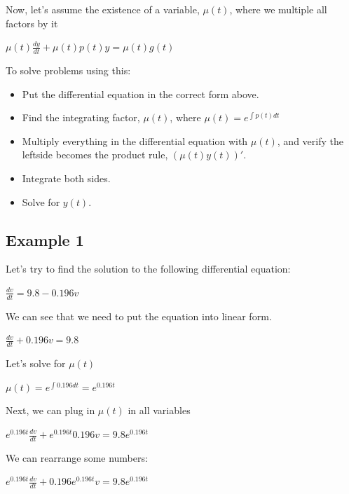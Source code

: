 \documentclass{article}
\begin{document}
Now, let's assume the existence of a variable, $\mu (t)$, where we multiple all factors by it

\begin{center}
    $\mu(t)\frac{dy}{dt} + \mu(t)p(t)y = \mu(t)g(t)$
\end{center}

To solve problems using this:
\begin{itemize}
    \item Put the differential equation in the correct form above.
    \item Find the integrating factor, $\mu (t)$, where $\mu (t) = e^{\int p(t) dt}$
    \item Multiply everything in the differential equation with $\mu (t)$, and verify the leftside becomes the product rule, $(\mu(t) y(t))'$.
    \item Integrate both sides.
    \item Solve for $y(t)$.
\end{itemize}

\subsection{Example 1}

Let's try to find the solution to the following differential equation:

\begin{center}
    $\frac{dv}{dt} = 9.8 - 0.196v$
\end{center}

We can see that we need to put the equation into linear form. 

\begin{center}
    $\frac{dv}{dt} + 0.196v = 9.8$
\end{center}

Let's solve for $\mu (t)$

\begin{center}
    $\mu (t) = e^{\int 0.196 dt} = e^{0.196t}$
\end{center}

Next, we can plug in $\mu (t)$ in all variables

\begin{center}
    $e^{0.196t}\frac{dv}{dt} + e^{0.196t} 0.196v = 9.8e^{0.196t}$
\end{center}

We can rearrange some numbers:

\begin{center}
    $e^{0.196t}\frac{dv}{dt} +  0.196e^{0.196t}v = 9.8e^{0.196t}$
\end{center}
\end{document}
